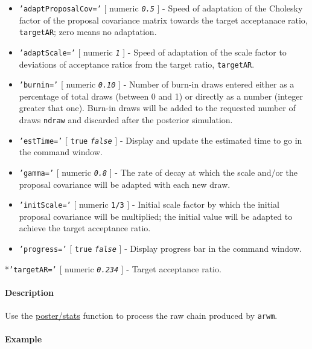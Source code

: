  \begin{itemize}
 \item
   \texttt{'adaptProposalCov='} {[} numeric \textbar{}
   \emph{\texttt{0.5}} {]} - Speed of adaptation of the Cholesky factor
   of the proposal covariance matrix towards the target acceptanace
   ratio, \texttt{targetAR}; zero means no adaptation.
 \item
   \texttt{'adaptScale='} {[} numeric \textbar{} \emph{\texttt{1}} {]} -
   Speed of adaptation of the scale factor to deviations of acceptance
   ratios from the target ratio, \texttt{targetAR}.
 \item
   \texttt{'burnin='} {[} numeric \textbar{} \emph{\texttt{0.10}} {]} -
   Number of burn-in draws entered either as a percentage of total draws
   (between 0 and 1) or directly as a number (integer greater that one).
   Burn-in draws will be added to the requested number of draws
   \texttt{ndraw} and discarded after the posterior simulation.
 \item
   \texttt{'estTime='} {[} \texttt{true} \textbar{} \emph{\texttt{false}}
   {]} - Display and update the estimated time to go in the command
   window.
 \item
   \texttt{'gamma='} {[} numeric \textbar{} \emph{\texttt{0.8}} {]} - The
   rate of decay at which the scale and/or the proposal covariance will
   be adapted with each new draw.
 \item
   \texttt{'initScale='} {[} numeric \textbar{} \texttt{1/3} {]} -
   Initial scale factor by which the initial proposal covariance will be
   multiplied; the initial value will be adapted to achieve the target
   acceptance ratio.
 \item
   \texttt{'progress='} {[} \texttt{true} \textbar{}
   \emph{\texttt{false}} {]} - Display progress bar in the command
   window.
 \end{itemize}
 
 *\texttt{'targetAR='} {[} numeric \textbar{} \emph{\texttt{0.234}} {]} -
 Target acceptance ratio.
 
 \paragraph{Description}
 
 Use the \url{poster/stats} function to process the raw chain produced by
 \texttt{arwm}.
 
 \paragraph{Example}


